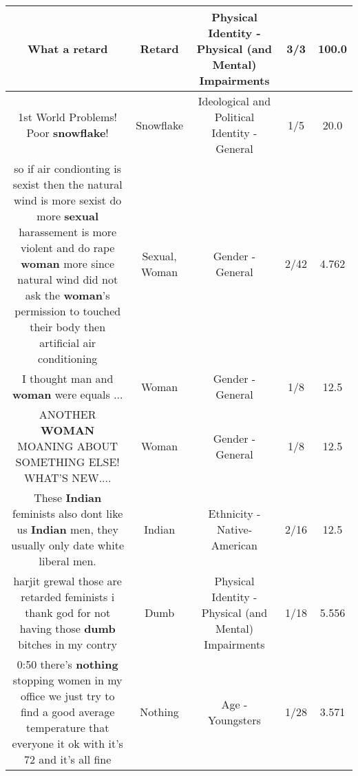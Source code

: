 \documentclass[11pt]{article}
\newlength\mylength
\begin{document}
\begin{center}
\begin{longtable}{|C{.65\mylength}|C{.30\mylength}|C{.12\mylength}|C{.12\mylength}|C{.12\mylength}|}
  \small What a retard\normalsize   & Retard & Physical Identity - Physical (and Mental) Impairments & 3/3 & 100.0 \\  \hline
  \small 1st World Problems! Poor \textbf{snowflake}!\normalsize   & Snowflake &  Ideological and Political Identity - General & 1/5 & 20.0 \\  \hline
  \small so if air condionting is sexist then the natural wind is more sexist do more \textbf{sexual} harassement is more violent and do rape \textbf{woman} more since natural wind did not ask the \textbf{woman}'s permission to touched their body then artificial air conditioning\normalsize   & Sexual, Woman & Gender - General & 2/42 & 4.762 \\  \hline
  \small I thought man and \textbf{woman} were equals ...\normalsize   & Woman & Gender - General & 1/8 & 12.5 \\  \hline
  \small ANOTHER \textbf{WOMAN} MOANING ABOUT SOMETHING ELSE! WHAT'S NEW....\normalsize   & Woman & Gender - General & 1/8 & 12.5 \\  \hline
  \small These \textbf{Indian} feminists also dont like us \textbf{Indian} men, they usually only date white liberal men.\normalsize   & Indian & Ethnicity - Native-American & 2/16 & 12.5 \\  \hline
  \small harjit grewal those are retarded feminists i thank god for not having those \textbf{dumb} bitches in my contry\normalsize   & Dumb & Physical Identity - Physical (and Mental) Impairments & 1/18 & 5.556 \\  \hline
  \small 0:50 there's \textbf{nothing} stopping women in my office we just try to find a good average temperature that everyone it ok with it's 72 and it's all fine\normalsize   & Nothing & Age - Youngsters & 1/28 & 3.571 \\  \hline

\end{longtable}
\end{center}
\end{document}

